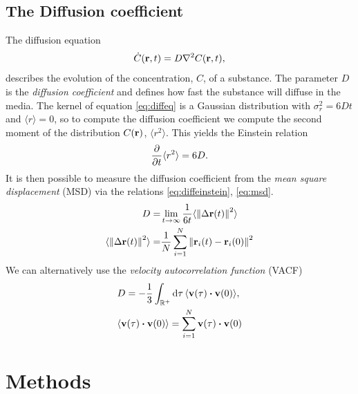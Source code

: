 \documentclass[%
aps,
pra,%
amsmath,amssymb,
preprint,%
reprint,%
notitlepage,
a4paper]{revtex4-1}
\newcommand{\average}[1]{\langle #1 \rangle}
\begin{document}
\subsection{The Diffusion coefficient \label{sec:diffcoeff}}
The diffusion equation
\begin{equation}
\dot{C}(\vb{r}, t) = D\nabla^2C(\vb{r}, t),
\label{eq:diffeq}
\end{equation}
describes the evolution of the concentration, $C$, of a substance. The parameter $D$ is the \textit{diffusion coefficient} and defines how fast the substance will diffuse in the media. The kernel of equation \ref{eq:diffeq} is a Gaussian distribution with $\sigma_r^2 = 6Dt$ and $\langle r\rangle=0$, so to compute the diffusion coefficient we compute the second moment of the distribution $C(\vb{r})$, $\langle r^2\rangle$. This yields the Einstein relation\cite{Einstein1905}
\begin{equation}
\pdv{t}\langle r^2\rangle = 6D.
\end{equation}
It is then possible to measure the diffusion coefficient from the \textit{mean square displacement} (MSD) via the relations \ref{eq:diffeinstein}, \ref{eq:msd}.
\begin{align}
\label{eq:diffeinstein}
D =& \lim_{t\rightarrow\infty} \frac{1}{6t}\langle\norm{\Delta\vb{r}(t)}^2\rangle\\
\label{eq:msd}
\langle\norm{\Delta\vb{r}(t)}^2\rangle =& \frac{1}{N}\sum_{i = 1}^{N}\norm{ \vb{r}_i(t) - \vb{r}_i(0)}^2
\end{align}
We can alternatively use the \textit{velocity autocorrelation function} (VACF)\cite{Kubo1957}
\begin{align}
\label{eq:diffvacf}
&D = -\frac{1}{3}\int_{\mathbb{R}^+}\dd{\tau} \langle \vb{v}(\tau)\dotproduct\vb{v}(0)\rangle,\\
&\average{\vb{v}(\tau)\dotproduct\vb{v}(0)} = \sum_{i = 1}^N \vb{v}(\tau)\dotproduct\vb{v}(0)
\end{align}
\section{Methods}
\end{document}
